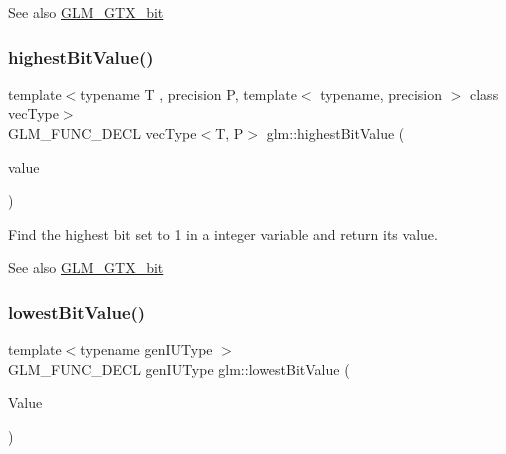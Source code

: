 \begin{DoxySeeAlso}{See also}
\hyperlink{group__gtx__bit}{G\+L\+M\+\_\+\+G\+T\+X\+\_\+bit} 
\end{DoxySeeAlso}
\mbox{\label{group__gtx__bit_ga5eea3a4d429040af13d39a7d7cd84d73}} 
\subsubsection{\texorpdfstring{highest\+Bit\+Value()}{highestBitValue()}\hspace{0.1cm}{\footnotesize\ttfamily [2/2]}}
{\footnotesize\ttfamily template$<$typename T , precision P, template$<$ typename, precision $>$ class vec\+Type$>$ \\
G\+L\+M\+\_\+\+F\+U\+N\+C\+\_\+\+D\+E\+CL vec\+Type$<$T, P$>$ glm\+::highest\+Bit\+Value (\begin{DoxyParamCaption}\item[{vec\+Type$<$ T, P $>$ const \&}]{value }\end{DoxyParamCaption})}

Find the highest bit set to 1 in a integer variable and return its value.

\begin{DoxySeeAlso}{See also}
\hyperlink{group__gtx__bit}{G\+L\+M\+\_\+\+G\+T\+X\+\_\+bit} 
\end{DoxySeeAlso}
\mbox{\label{group__gtx__bit_ga2ff6568089f3a9b67f5c30918855fc6f}} 
\subsubsection{\texorpdfstring{lowest\+Bit\+Value()}{lowestBitValue()}}
{\footnotesize\ttfamily template$<$typename gen\+I\+U\+Type $>$ \\
G\+L\+M\+\_\+\+F\+U\+N\+C\+\_\+\+D\+E\+CL gen\+I\+U\+Type glm\+::lowest\+Bit\+Value (\begin{DoxyParamCaption}\item[{gen\+I\+U\+Type}]{Value }\end{DoxyParamCaption})}

